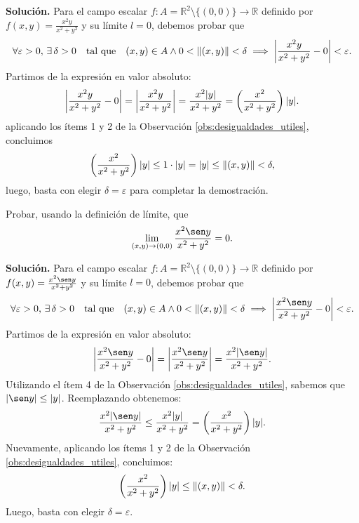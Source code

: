 \textbf{Soluci\'on.} Para el campo escalar $f: A=\mathbb{R}^{2} \setminus \{(0,0)\} \to \mathbb{R}$ definido por $f(x,y)=\frac{x^2 y}{x^2 + y^2}$ y su l\'imite $l=0$, debemos probar que 
\[ 
\forall \varepsilon > 0, \, \exists \, \delta > 0 \quad \text{tal que} \quad (x,y) \in A \land 0 < \lVert (x,y) \rVert < \delta \implies \abs{ \frac{x^2y}{x^2+y^2} - 0 } < \varepsilon. 
\] 
Partimos de la expresi\'on en valor absoluto:
\[ 
\abs{ \frac{x^2y}{x^2+y^2} - 0 } = \abs{ \frac{x^2y}{x^2+y^2} } = \frac{x^2 \abs{y}}{x^2+y^2} = \left( \frac{x^2}{x^2+y^2} \right) \abs{y}.
\] 
 aplicando los \'items 1 y 2 de la Observaci\'on \eqref{obs:desigualdades_utiles}, concluimos
\[ 
\left( \frac{x^2}{x^2+y^2} \right) \abs{y} \le 1 \cdot \abs{y} = \abs{y} \le \lVert (x,y) \rVert < \delta,
\]
luego, basta con elegir $\delta = \varepsilon$ para completar la demostraci\'on.

\begin{example} 
Probar, usando la definici\'on de l\'imite, que 
\[ 
\lim_{(x,y) \to (0,0)} \frac{x^2 \sen y}{x^2 + y^2} = 0. 
\] 
\end{example} 

\textbf{Soluci\'on.} Para el campo escalar $f: A=\mathbb{R}^{2} \setminus \{(0,0)\} \to \mathbb{R}$ definido por $f(x,y)=\frac{x^2 \sen y}{x^2 + y^2}$ y su l\'imite $l=0$, debemos probar que 
\[ 
\forall \varepsilon > 0, \, \exists \, \delta > 0 \quad \text{tal que} \quad (x,y) \in A \land 0 < \lVert (x,y) \rVert < \delta \implies \abs{ \frac{x^2 \sen y}{x^2+y^2} - 0 } < \varepsilon. 
\] 
Partimos de la expresi\'on en valor absoluto:
\[ 
\abs{ \frac{x^2 \sen y}{x^2+y^2} - 0 } = \abs{ \frac{x^2 \sen y}{x^2+y^2} } = \frac{x^2 \abs{\sen y}}{x^2+y^2}.
\] 
Utilizando el \'item 4 de la Observaci\'on \eqref{obs:desigualdades_utiles}, sabemos que $\abs{\sen y} \le \abs{y}$. Reemplazando obtenemos:
\[ 
\frac{x^2 \abs{\sen y}}{x^2+y^2} \le \frac{x^2 \abs{y}}{x^2+y^2} = \left( \frac{x^2}{x^2+y^2} \right) \abs{y}.
\] 
Nuevamente, aplicando los \'items 1 y 2 de la Observaci\'on \eqref{obs:desigualdades_utiles}, concluimos:
\[ 
 \left( \frac{x^2}{x^2+y^2} \right) \abs{y} \le  \lVert (x,y) \rVert < \delta.
\] 
Luego, basta con elegir $\delta = \varepsilon$.






